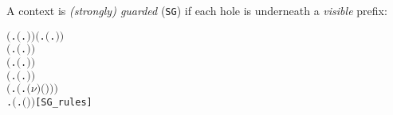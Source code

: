 A context is \emph{(strongly) guarded} (\texttt{SG}) if each hole is underneath a \emph{visible} prefix:
\begin{alltt}
\HOLTokenTurnstile{} \ensuremath{(}\HOLSymConst{\HOLTokenForall{}}.  \ensuremath{(}\HOLTokenLambda{}. \ensuremath{)}\ensuremath{)} \HOLSymConst{\HOLTokenConj{}} \ensuremath{(}\HOLSymConst{\HOLTokenForall{}} .   \HOLSymConst{\HOLTokenImp{}}  \ensuremath{(}\HOLTokenLambda{}.  \HOLSymConst{\ensuremath{\ldotp}} \ensuremath{)}\ensuremath{)} \HOLSymConst{\HOLTokenConj{}}
   \ensuremath{(}\HOLSymConst{\HOLTokenForall{}} .   \HOLSymConst{\HOLTokenImp{}}  \ensuremath{(}\HOLTokenLambda{}. \HOLSymConst{\ensuremath{\ldotp}} \ensuremath{)}\ensuremath{)} \HOLSymConst{\HOLTokenConj{}}
   \ensuremath{(}\HOLSymConst{\HOLTokenForall{}} .   \HOLSymConst{\HOLTokenConj{}}   \HOLSymConst{\HOLTokenImp{}}  \ensuremath{(}\HOLTokenLambda{}.   \HOLSymConst{\ensuremath{+}}  \ensuremath{)}\ensuremath{)} \HOLSymConst{\HOLTokenConj{}}
   \ensuremath{(}\HOLSymConst{\HOLTokenForall{}} .   \HOLSymConst{\HOLTokenConj{}}   \HOLSymConst{\HOLTokenImp{}}  \ensuremath{(}\HOLTokenLambda{}.   \HOLSymConst{\ensuremath{\mid}}  \ensuremath{)}\ensuremath{)} \HOLSymConst{\HOLTokenConj{}}
   \ensuremath{(}\HOLSymConst{\HOLTokenForall{}} .   \HOLSymConst{\HOLTokenImp{}}  \ensuremath{(}\HOLTokenLambda{}. \ensuremath{(\nu}\ensuremath{)} \ensuremath{(} \ensuremath{)}\ensuremath{)}\ensuremath{)} \HOLSymConst{\HOLTokenConj{}}
   \HOLSymConst{\HOLTokenForall{}} .   \HOLSymConst{\HOLTokenImp{}}  \ensuremath{(}\HOLTokenLambda{}.  \ensuremath{(} \ensuremath{)} \ensuremath{)}\hfill{[SG_rules]}
\end{alltt}

